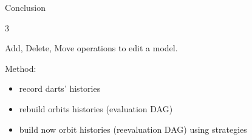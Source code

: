 \documentclass[portrait,a1paper,fontscale=0.45,]{baposter}
\begin{document}
\begin{poster}
\begin{posterbox}[name=conclusion, below=evaluation, span=2]{Conclusion}
\begin{multicols}{3}
      \columnbreak

      \begin{minipage}[c]{\linewidth}
        Add, Delete, Move operations to edit a model.
      \end{minipage}

      \columnbreak

      \begin{minipage}[c]{\linewidth}
        Method:
        \begin{itemize}
          \item record darts' histories
          \item rebuild orbits histories (evaluation DAG)
          \item build now orbit histories (reevaluation DAG) using strategies
        \end{itemize}
      \end{minipage}
    \end{multicols}
  \end{posterbox}




\end{poster}
\end{document}
